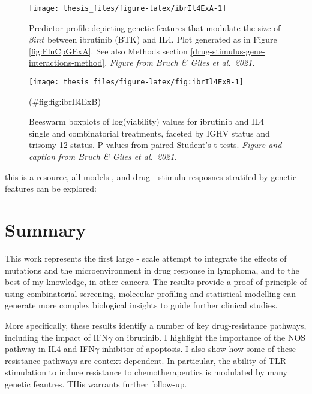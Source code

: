 \documentclass[11pt, a4paper, twosided]{book}
\begin{document}
\begin{figure}

{\centering \texttt{[image: thesis\_files/figure-latex/ibrIl4ExA-1]} 

}

\caption{Predictor profile depicting genetic features that modulate the size of \(\beta{int}\) between ibrutinib (BTK) and IL4. Plot generated as in Figure \ref{fig:FluCpGExA}. See also Methods section \ref{drug-stimulus-gene-interactions-method}. \emph{Figure from Bruch \& Giles et al.~2021.}}\label{fig:ibrIl4ExA}
\end{figure}
\begin{figure}

{\centering \texttt{[image: thesis\_files/figure-latex/fig:ibrIl4ExB-1]} 

}

\caption{Beeswarm boxplots of log(viability) values for ibrutinib and IL4 single and combinatorial treatments, faceted by IGHV status and trisomy 12 status. P-values from paired Student's t-tests. \emph{Figure and caption from Bruch \& Giles et al.~2021.}}(\#fig:fig:ibrIl4ExB)
\end{figure}
this is a resource, all models , and drug - stimulu resposnes stratifed by genetic features can be explored:

\hypertarget{summary-2}{%
\section{Summary}\label{summary-2}}

This work represents the first large - scale attempt to integrate the effects of mutations and the microenvironment in drug response in lymphoma, and to the best of my knowledge, in other cancers. The results provide a proof-of-principle of using combinatorial screening, molecular profiling and statistical modelling can generate more complex biological insights to guide further clinical studies.

More specifically, these results identify a number of key drug-resistance pathways, including the impact of IFN\(\gamma\) on ibrutinib. I highlight the importance of the NOS pathway in IL4 and IFN\(\gamma\) inhibitor of apoptosis. I also show how some of these resistance pathways are context-dependent. In particular, the ability of TLR stimulation to induce resistance to chemotherapeutics is modulated by many genetic feautres. THis warrants further follow-up.
\end{document}
